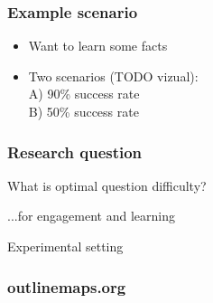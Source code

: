 \documentclass[bigger]{beamer}
\begin{document}
\begin{frame}
  \frametitle{Example scenario}
	\begin{itemize}
	  \item Want to learn some facts
		\item Two scenarios (TODO vizual): \\
		A) 90\% success rate \\
		B) 50\% success rate
	\end{itemize}
\end{frame}

\begin{frame}
  \frametitle{Research question}
	\begin{center}
    {\Huge What is optimal question difficulty?} 

		\medskip
    ...for engagement and learning
	\end{center}
\end{frame}

\begin{frame}
	\begin{center}
    {\Huge Experimental setting} 
	\end{center}
\end{frame}

\begin{frame}
	\frametitle{outlinemaps.org}
\end{frame}
\end{document}
